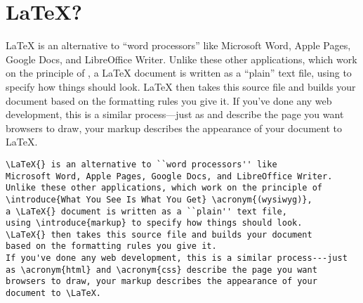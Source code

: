 \section{\texorpdfstring{\LaTeX}{LaTeX}?}
\LaTeX{} is an alternative to ``word processors'' like
Microsoft Word, Apple Pages, Google Docs, and LibreOffice Writer.
Unlike these other applications, which work on the principle of
 ,
a \LaTeX{} document is written as a ``plain'' text file,
using  to specify how things should look.
\LaTeX{} then takes this source file and builds your document
based on the formatting rules you give it.
If you've done any web development, this is a similar process---just
as  and  describe the page you want
browsers to draw, your markup describes the appearance of your
document to \LaTeX.

\begin{leftfigure}
\begin{lstlisting}
\LaTeX{} is an alternative to ``word processors'' like
Microsoft Word, Apple Pages, Google Docs, and LibreOffice Writer.
Unlike these other applications, which work on the principle of
\introduce{What You See Is What You Get} \acronym{(wysiwyg)},
a \LaTeX{} document is written as a ``plain'' text file,
using \introduce{markup} to specify how things should look.
\LaTeX{} then takes this source file and builds your document
based on the formatting rules you give it.
If you've done any web development, this is a similar process---just
as \acronym{html} and \acronym{css} describe the page you want
browsers to draw, your markup describes the appearance of your
document to \LaTeX.
\end{lstlisting}
\end{leftfigure}
\vfill

